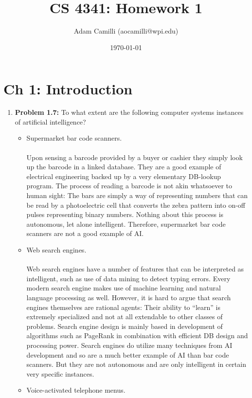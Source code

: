 \documentclass[10pt]{article}
\begin{document}
\title{CS 4341: Homework 1}
\author{Adam Camilli (aocamilli@wpi.edu)}
\date{\today}
\maketitle

\section*{Ch 1: Introduction}
\begin{enumerate}
\item \textbf{Problem 1.7:} To what extent are the following computer systems
  instances of artificial intelligence?
  \begin{itemize}
  \item Supermarket bar code scanners. \\~\\ 
     Upon sensing a barcode provided by a buyer or cashier they
    simply look up the barcode in a linked database. They are a good example
    of electrical engineering backed up by a very elementary DB-lookup
    program. The process of
    reading a barcode is not akin whatsoever to human sight: The bars
    are simply a way of representing numbers that can be read by a
    photoelectric cell that converts the zebra pattern into on-off
    pulses representing binary numbers. Nothing about this process is
    autonomous, let alone intelligent. Therefore, supermarket bar code
    scanners are not a good example of AI.
  \item Web search engines. \\~\\ 
    Web search engines have a number of features that can be
    interpreted as intelligent, such as use of data mining to detect
    typing errors. Every modern search engine makes
    use of machine learning and natural language
    processing as well. However, it is hard to argue that search engines themselves
    are rational agents: Their ability to ``learn'' is extremely
    specialized and not at all extendable to other classes of
    problems. Search engine design is mainly based in development of algorithms
    such as PageRank in combination with efficient DB design and
    processing power. Search
    engines do utilize many techniques from AI development and so are a much better example of AI than bar code
    scanners. But they are not autonomous and are only intelligent in
    certain very specific instances. 
  \item Voice-activated telephone menus. \\~\\

\end{itemize}
\end{enumerate}
\end{document}
